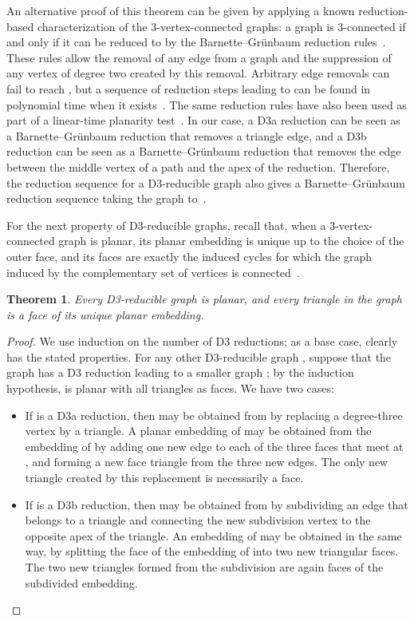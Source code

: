 \documentclass{article}
\newtheorem{theorem}{Theorem}
\begin{document}
An alternative proof of this theorem can be given by applying a known reduction-based characterization of the 3-vertex-connected graphs: a graph is 3-connected if and only if it can be reduced to  by the Barnette--Gr\"unbaum reduction rules~\cite[Thm.~1]{BarGru-MFGT-69}. These rules allow the removal of any edge from a graph and the suppression of any vertex of degree two created by this removal. Arbitrary edge removals can fail to reach , but a sequence of reduction steps leading to  can be found in polynomial time when it exists~\cite{Sch-Algo-12}. The same reduction rules have also been used as part of a linear-time planarity test~\cite{Sch-MFCS-13}. In our case, a D3a reduction can be seen as a Barnette--Gr\"unbaum reduction that removes a triangle edge, and a D3b reduction can be seen as a Barnette--Gr\"unbaum reduction that removes the edge between the middle vertex of a path and the apex of the reduction. Therefore, the reduction sequence for a D3-reducible graph also gives a Barnette--Gr\"unbaum reduction sequence taking the graph to~.

For the next property of D3-reducible graphs, recall that, when a 3-vertex-connected graph is planar, its planar embedding is unique up to the choice of the outer face, and its faces are exactly the induced cycles for which the graph induced by the complementary set of vertices is connected~\cite{Bru-JCTB-04}.

\begin{theorem}
Every D3-reducible graph is planar, and every triangle in the graph is a face of its unique planar embedding.
\end{theorem}

\begin{proof}
We use induction on the number of D3 reductions; as a base case,  clearly has the stated properties. For any other D3-reducible graph , suppose that the graph has a D3 reduction  leading to a smaller graph ; by the induction hypothesis,  is planar with all triangles as faces. We have two cases:
\begin{itemize}
\item If  is a D3a reduction, then  may be obtained from  by replacing a degree-three vertex  by a triangle. A planar embedding of  may be obtained from the embedding of  by adding one new edge to each of the three faces that meet at , and forming a new face triangle from the three new edges. The only new triangle created by this replacement is necessarily a face.
\item If  is a D3b reduction, then  may be obtained from  by subdividing an edge  that belongs to a triangle  and connecting the new subdivision vertex to the opposite apex  of the triangle. An embedding of  may be obtained in the same way, by splitting the face  of the embedding of  into two new triangular faces. The two new triangles formed from the subdivision are again faces of the subdivided embedding.\qedhere
\end{itemize}
\end{proof}
\end{document}
